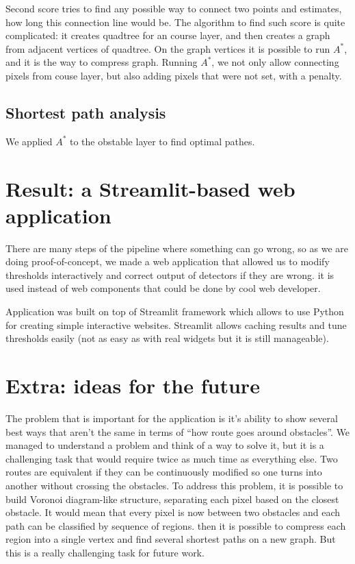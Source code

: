 \documentclass[a4paper,12pt]{extarticle}
\begin{document}
Second score tries to find any possible way to connect two points and estimates, how long this connection line would be.
The algorithm to find such score is quite complicated: it creates quadtree for an course layer, and then creates a graph from adjacent vertices of quadtree.
On the graph vertices it is possible to run $A^*$, and it is the way to compress graph.
Running $A^*$, we not only allow connecting pixels from couse layer, but also adding pixels that were not set, with a penalty.

\subsection{Shortest path analysis}

We applied $A^*$ to the obstable layer to find optimal pathes.

\section{Result: a Streamlit-based web application}

There are many steps of the pipeline where something can go wrong, so as we are doing proof-of-concept, we made a web application that allowed us to modify thresholds interactively and correct output of detectors if they are wrong. it is used instead of web components that could be done by cool web developer.

Application was built on top of Streamlit framework which allows to use Python for creating simple interactive websites. Streamlit allows caching results and tune thresholds easily (not as easy as with real widgets but it is still manageable).


\section{Extra: ideas for the future}

The problem that is important for the application is it’s ability to show several best ways that aren’t the same in terms of “how route goes around obstacles”. We managed to understand a problem and think of a way to solve it, but it is a challenging task that would require twice as much time as everything else.
Two routes are equivalent if they can be continuously modified so one turns into another without crossing the obstacles.
To address this problem, it is possible to build Voronoi diagram-like structure, separating each pixel based on the closest obstacle. It would mean that every pixel is now between two obstacles and each path can be classified by sequence of regions. then it is possible to compress each region into a single vertex and find several shortest paths on a new graph. But this is a really challenging task for future work.
\end{document}
